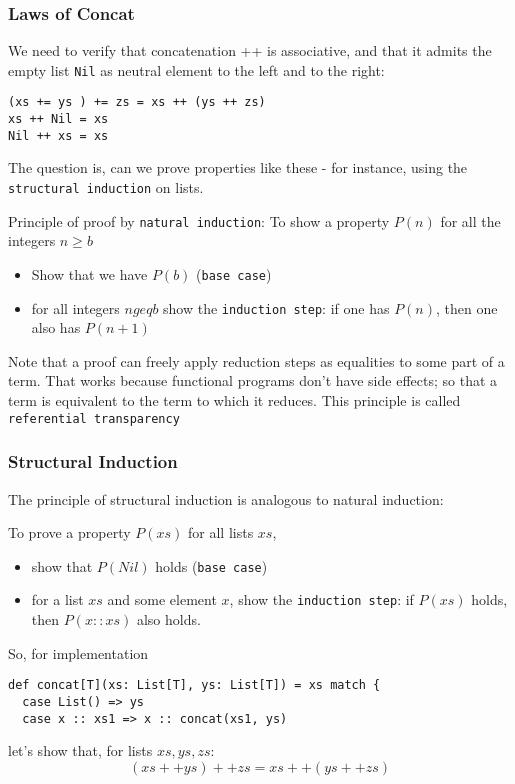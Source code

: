 \documentclass{scrartcl}
\newcommand{\term}[1]{\verb~#1~} %
\begin{document}
\subsubsection{Laws of Concat}
\label{sec:LawsOfConcat}
We need to verify that concatenation ++ is associative, and that it admits the
empty list \lstinline|Nil| as neutral element to the left and to the right:
\begin{lstlisting}
(xs += ys ) += zs = xs ++ (ys ++ zs)
xs ++ Nil = xs
Nil ++ xs = xs
\end{lstlisting}
The question is, can we prove properties like these - for instance, using the
\term{structural induction} on lists.

Principle of proof by \term{natural induction}: To show a property $P(n)$ for
all the integers $n \geq b$
\begin{itemize}
\item Show that we have $P(b)$ (\term{base case})
\item for all integers $n geq b$ show the \term{induction step}: if one has
  $P(n)$, then one also has $P(n + 1)$
\end{itemize}

Note that a proof can freely apply reduction steps as equalities to some part of
a term. That works because functional programs don't have side effects; so that
a term is equivalent to the term to which it reduces. This principle is called
\term{referential transparency}

\subsubsection{Structural Induction}
\label{sec:StructuralInduction}
The principle of structural induction is analogous to natural induction:

To prove a property $P(xs)$ for all lists $xs$,
\begin{itemize}
\item show that $P(Nil)$ holds (\term{base case})
\item for a list $xs$ and some element $x$, show the \term{induction step}: if
  $P(xs)$ holds, then $P(x :: xs)$ also holds.
\end{itemize}

So, for implementation
\begin{lstlisting}
def concat[T](xs: List[T], ys: List[T]) = xs match {
  case List() => ys
  case x :: xs1 => x :: concat(xs1, ys)
\end{lstlisting}
let's show that, for lists $xs, ys, zs$:
$$ (xs ++ ys) ++ zs = xs ++ (ys ++ zs)$$
\end{document}
